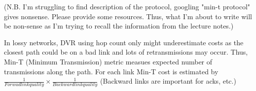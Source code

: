 \documentclass[12pt]{article}
\begin{document}
(N.B. I'm struggling to find description of the protocol, googling "min-t
protocol" gives nonsense. Please provide some resources. Thus, what I'm about
to write will be non-sense as I'm trying to recall the information from the
lecture notes.)

In lossy networks, DVR using hop count only might underestimate costs as the
closest path could be on a bad link and lots of retransmissions may occur.
Thus, Min-T (Minimum Transmission) metric measues expected number of
transmissions along the path. For each link Min-T cost is estimated by
$\frac{1}{Forwad link quality}\times\frac{1}{Backward link quality}$ (Backward
links are important for acks, etc.)
\end{document}
